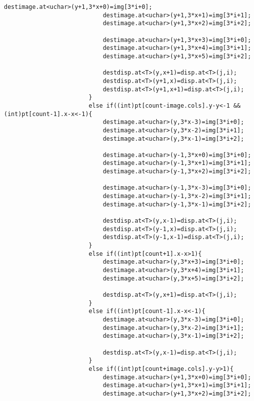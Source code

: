 \begin{lstlisting}[basicstyle=\tiny]
                            destimage.at<uchar>(y+1,3*x+0)=img[3*i+0];
                            destimage.at<uchar>(y+1,3*x+1)=img[3*i+1];
                            destimage.at<uchar>(y+1,3*x+2)=img[3*i+2];

                            destimage.at<uchar>(y+1,3*x+3)=img[3*i+0];
                            destimage.at<uchar>(y+1,3*x+4)=img[3*i+1];
                            destimage.at<uchar>(y+1,3*x+5)=img[3*i+2];

                            destdisp.at<T>(y,x+1)=disp.at<T>(j,i);
                            destdisp.at<T>(y+1,x)=disp.at<T>(j,i);
                            destdisp.at<T>(y+1,x+1)=disp.at<T>(j,i);
                        }
                        else if((int)pt[count-image.cols].y-y<-1 && (int)pt[count-1].x-x<-1){
                            destimage.at<uchar>(y,3*x-3)=img[3*i+0];
                            destimage.at<uchar>(y,3*x-2)=img[3*i+1];
                            destimage.at<uchar>(y,3*x-1)=img[3*i+2];

                            destimage.at<uchar>(y-1,3*x+0)=img[3*i+0];
                            destimage.at<uchar>(y-1,3*x+1)=img[3*i+1];
                            destimage.at<uchar>(y-1,3*x+2)=img[3*i+2];

                            destimage.at<uchar>(y-1,3*x-3)=img[3*i+0];
                            destimage.at<uchar>(y-1,3*x-2)=img[3*i+1];
                            destimage.at<uchar>(y-1,3*x-1)=img[3*i+2];

                            destdisp.at<T>(y,x-1)=disp.at<T>(j,i);
                            destdisp.at<T>(y-1,x)=disp.at<T>(j,i);
                            destdisp.at<T>(y-1,x-1)=disp.at<T>(j,i);
                        }
                        else if((int)pt[count+1].x-x>1){
                            destimage.at<uchar>(y,3*x+3)=img[3*i+0];
                            destimage.at<uchar>(y,3*x+4)=img[3*i+1];
                            destimage.at<uchar>(y,3*x+5)=img[3*i+2];

                            destdisp.at<T>(y,x+1)=disp.at<T>(j,i);
                        }
                        else if((int)pt[count-1].x-x<-1){
                            destimage.at<uchar>(y,3*x-3)=img[3*i+0];
                            destimage.at<uchar>(y,3*x-2)=img[3*i+1];
                            destimage.at<uchar>(y,3*x-1)=img[3*i+2];

                            destdisp.at<T>(y,x-1)=disp.at<T>(j,i);
                        }
                        else if((int)pt[count+image.cols].y-y>1){
                            destimage.at<uchar>(y+1,3*x+0)=img[3*i+0];
                            destimage.at<uchar>(y+1,3*x+1)=img[3*i+1];
                            destimage.at<uchar>(y+1,3*x+2)=img[3*i+2];


\end{lstlisting}
